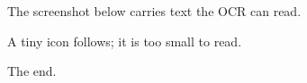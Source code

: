 \documentclass[11pt,a4paper]{article}
\begin{document}
The screenshot below carries text the OCR can read.

\begin{figure}[h]
\end{figure}

A tiny icon follows; it is too small to read.

\begin{figure}[h]
\end{figure}

The end.
\end{document}
